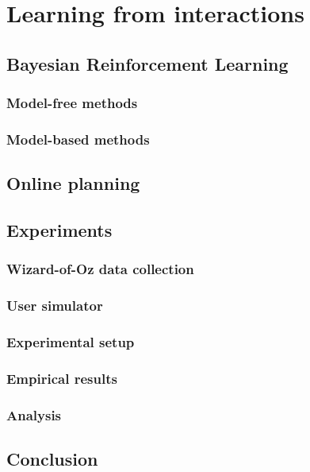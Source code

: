 \chapter{Learning from interactions}
\label{chap:rllearning}

\section{Bayesian Reinforcement Learning}

\subsection{Model-free methods}

\subsection{Model-based methods}

\section{Online planning}

\section{Experiments}

\label{sec:rllearning-experiments}

\subsection{Wizard-of-Oz data collection}

\subsection{User simulator}

\subsection{Experimental setup}

\subsection{Empirical results}

\subsection{Analysis}

\section{Conclusion}